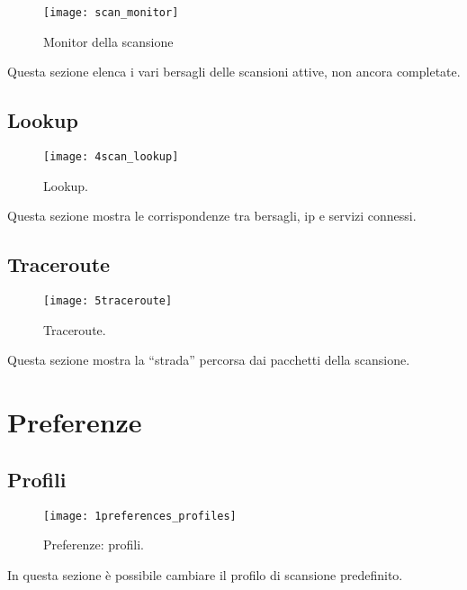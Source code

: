\begin{figure}[h]
  \centering
  \texttt{[image: scan\_monitor]}
  \caption{Monitor della scansione}
  \label{fig:ContentsScanMonitor}
\end{figure}
Questa sezione elenca i vari bersagli delle scansioni attive, non ancora 
completate.

\section{Lookup}
\label{sec:ContentsScanMonitorLookup}

\begin{figure}[h]
  \centering
  \texttt{[image: 4scan\_lookup]}
  \caption{Lookup.}
  \label{fig:ContentsScanMonitorLookup}
\end{figure}
Questa sezione mostra le corrispondenze tra bersagli, ip e servizi connessi.

\section{Traceroute}
\label{sec:ContentsScanMonitorTraceroute}

\begin{figure}[h]
  \centering
  \texttt{[image: 5traceroute]}
  \caption{Traceroute.}
  \label{fig:ContentsScanMonitorTraceroute}
\end{figure}
Questa sezione mostra la ``strada'' percorsa dai pacchetti della scansione.

\chapter{Preferenze}
\label{ch:Preferences}

\section{Profili}
\label{sec:Preferencesprofiles}

\begin{figure}[h]
  \centering
  \texttt{[image: 1preferences\_profiles]}
  \caption{Preferenze: profili.}
  \label{fig:PreferencesProfili}
\end{figure}
In questa sezione \`e possibile cambiare il profilo di scansione predefinito.

